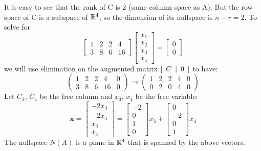 \begin{itemize}
    It is easy to see that the rank of C is 2 (same column space as A). But the row space of C is a subspace of \(\mathbb{R}^4\), so the dimension of its nullspace is \(n - r = 2\). To solve for 
        \[\begin{bmatrix} 1 & 2 & 2 & 4 \\ 3 & 8 & 6 & 16 \end{bmatrix} \begin{bmatrix} x_1 \\ x_2 \\ x_3 \\ x_4 \end{bmatrix} = \begin{bmatrix} 0 \\ 0 \end{bmatrix}\]
    we will use elimination on the augmented matrix  \([\hspace{0.5em} C \hspace{0.5em} |\hspace{0.5em} 0 \hspace{0.5em}]\)  to have:
        \[\left(\begin{array}{cccc|c}  1 & 2 & 2 & 4 & 0 \\ 3 & 8 & 6 & 16 & 0  \end{array}\right) \Longrightarrow \left(\begin{array}{cccc|c}  1 & 2 & 2 & 4 & 0  \\ 0 & 2 & 0 & 4 & 0 \end{array}\right) \]
        Let \(C_3\), \(C_4\) be the free column and \(x_3\), \(x_4\) be the free variable: \[\textbf{x} = \begin{bmatrix} -2x_3 \\ -2x_4 \\ x_3 \\ x_4 \end{bmatrix} = \begin{bmatrix} -2 \\ 0 \\ 1 \\ 0 \end{bmatrix}x_3 + \begin{bmatrix} 0 \\ -2 \\ 0 \\ 1 \end{bmatrix}x_4\]
        The nullspace \(N(A)\) is a plane in \(\mathbb{R}^4\) that is spanned by the above vectors. 
    
\end{itemize}


